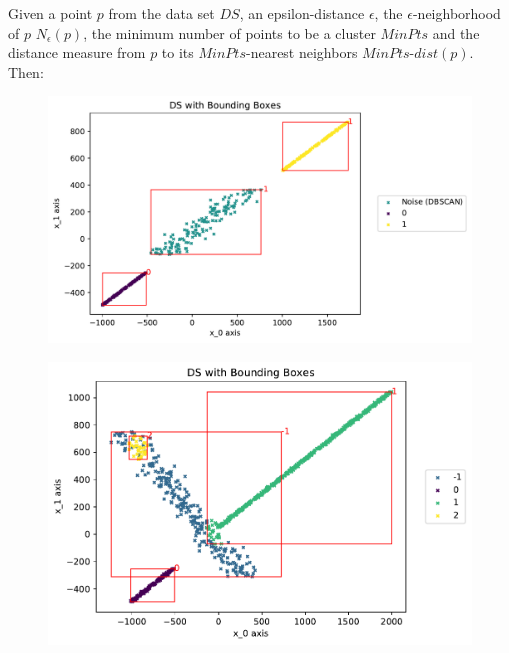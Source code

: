Given a point $p$ from the data set $DS$, an epsilon-distance $\epsilon$, the  $\epsilon$-neighborhood of $p$ $N_{\epsilon}(p)$, the minimum number of points to be a cluster $MinPts$ and the distance measure from $p$ to its $MinPts$-nearest neighbors $MinPts$-$dist(p)$. Then:
\begin{figure}
    \centering
    \begin{minipage}{.47\textwidth}
      \centering
      \includegraphics[width=.8\textwidth]{figures/DSwithDBSCANbadBoundingBoxes.pdf}
      \label{fig:baddbscan}
    \end{minipage}%
    \begin{minipage}{.53 \textwidth}
      \centering
      \includegraphics[width=.8\textwidth]{figures/DSwithOPTICSBoundingBoxes.pdf}
      \label{fig:goodoptics}
    \end{minipage}
\end{figure}

